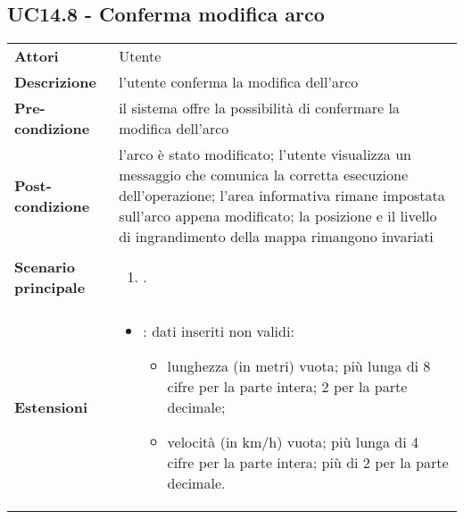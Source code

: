 \subsection{UC14.8 - Conferma modifica arco} 
\label{sssec:UC14.8} 
\def\arraystretch{1.5}
\begin{tabularx}{\textwidth}{l|p{}}
	\rowcolor{I} \multicolumn{2}{c}{\color{white}\textbf{UC14.8 - Conferma modifica arco}} \\
	\toprule
	\endhead
	\textbf{Attori} & Utente\\
	\textbf{Descrizione} & l'utente conferma la modifica dell'arco\\
	\textbf{Pre-condizione} & il sistema offre la possibilità di confermare la modifica dell'arco\\
	\textbf{Post-condizione} & l'arco è stato modificato;  l'utente visualizza un messaggio che comunica la corretta esecuzione dell'operazione; l'area informativa rimane impostata sull'arco appena modificato; la posizione e il livello di ingrandimento della mappa rimangono invariati\\
	\textbf{Scenario principale} & \vspace{-1.2em}\begin{enumerate}[leftmargin=*,noitemsep,nosep]
		\item \nameref{sssec:UC14.8}.
	\end{enumerate}\\
	\textbf{Estensioni} & \vspace{-1.2em}\begin{itemize}[leftmargin=*,noitemsep,nosep]
		\item \nameref{sssec:UC14.9}: dati inseriti non validi:
		\begin{itemize}
			\item lunghezza (in metri) vuota;
			più lunga di 8 cifre per la parte intera; 2 per la parte
			decimale;
			\item velocità (in km/h) vuota; più
			lunga di 4 cifre per la parte intera; più di 2 per la parte
			decimale.
		\end{itemize}
	\end{itemize}\\
	\bottomrule
\end{tabularx}
